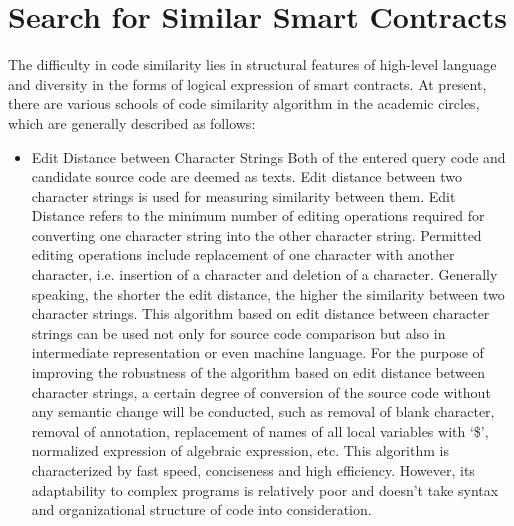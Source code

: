 \section{Search for Similar Smart Contracts}
\label{appendix:sim_code}

The difficulty in code similarity lies in structural features of high-level language and diversity in the forms of logical expression of smart contracts. At present, there are various schools of code similarity algorithm in the academic circles, which are generally described as follows: 


\begin{itemize}
	\item Edit Distance between Character Strings 
	Both of the entered query code and candidate source code are deemed as texts. Edit distance between two character strings is used for measuring similarity between them. Edit Distance refers to the minimum number of editing operations required for converting one character string into the other character string. Permitted editing operations include replacement of one character with another character, i.e. insertion of a character and deletion of a character. Generally speaking, the shorter the edit distance, the higher the similarity between two character strings. This algorithm based on edit distance between character strings can be used not only for source code comparison but also in intermediate representation or even machine language.
	For the purpose of improving the robustness of the algorithm based on edit distance between character strings, a certain degree of conversion of the source code without any semantic change will be conducted, such as removal of blank character, removal of annotation, replacement of names of all local variables with ‘\$’, normalized expression of algebraic expression, etc. This algorithm is characterized by fast speed, conciseness and high efficiency. However, its adaptability to complex programs is relatively poor and doesn't take syntax and organizational structure of code into consideration. 


\end{itemize}
